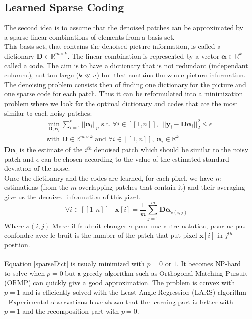 \documentclass{ipol}
\newcommand{\psize}{m}
\newcommand{\dsize}{k}
\newcommand{\dict}{\textbf{D}}
\newcommand{\code}{\bm{\alpha}}
\newcommand{\pnorm}{p}
\newcommand{\denoi}{\textbf{x}}
\newcommand{\noi}{\textbf{y}}
\newcommand{\RR}{\mathbb{R}}
\begin{document}
\subsection{ Learned Sparse Coding}

The second idea is to assume that the denoised patches can be approximated by a sparse linear combinations of elements from a basis set.\\
This basis set, that contains the denoised picture information, is called a dictionary $\dict \in \RR^{\psize \times \dsize}$. The linear combination is represented by a vector $\code \in \RR^{\dsize}$ called a code.
The aim is to have a dictionary that is not redundant (independant columns), not too large ($\dsize \ll n$) but that contains the whole picture information.\\
The denoising problem consists then of finding one dictionary for the picture and one sparse code for each patch. Thus it can be reformulated into a minimization problem where we look for the optimal dictionary and codes that are the most similar to each noisy patches:
\begin{equation}
\begin{split}
	& \min_{\dict, \code_i} \sum_{i=1}^{n} ||\code_i||_\pnorm \text{ s.t. } \forall i \in [\![1,n]\!],\ \ ||\noi_i  - \dict \code_i||^2_2 \leqslant \epsilon \\
	& \text{with } \dict \in \RR^{\psize \times \dsize} \text{ and } \forall i \in [\![1,n]\!], \ \code_i \in \RR^\dsize
	\label{sparseDict}
\end{split}
\end{equation}
$\dict \code_i$ is the estimate of the $i^{th}$ denoised patch which should be similar to the noisy patch and $\epsilon$ can be chosen according to the value of the estimated standard deviation of the noise.\\
Once the dictionary and the codes are learned, for each pixel, we have $\psize$ estimations (from the $\psize$ overlapping patches that contain it) and their averaging give us the denoised information of this pixel:
\begin{equation}
	\forall i \in [\![1,n]\!], \ \ \denoi[i] = \frac{1}{\psize} \sum_{j=1}^\psize \dict \code_{\sigma(i,j)}
\end{equation}
Where $\sigma(i,j)$ {\color{red} Marc: il faudrait changer $\sigma$ pour une autre notation, pour ne pas confondre avec le bruit} is the number of the patch that put pixel $\denoi[i]$ in $j^{th}$ position.\\
\\
Equation \eqref{sparseDict} is usualy minimized with $\pnorm = 0$ or $1$. It becomes NP-hard to solve when $\pnorm=0$ but a greedy algorithm such as Orthogonal Matching Pursuit (ORMP) \cite{OMP} can quickly give a good approximation. The problem is convex with $\pnorm=1$ and is efficiently solved with the Least Angle Regression (LARS) algorithm \cite{LARS}. Experimental observations \cite{l0l1} have shown that the learning part is better with $\pnorm=1$ and the recomposition part with $\pnorm=0$.\\
\end{document}
